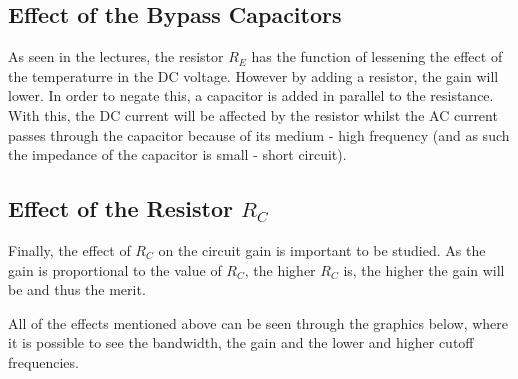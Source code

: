 \subsection{Effect of the Bypass Capacitors}

\par As seen in the lectures, the resistor $R_E$ has the function of lessening the effect of the temperaturre in the DC voltage. However by adding a resistor, the gain will lower. In order to negate this, a capacitor is added in parallel to the resistance. With this, the DC current will be affected by the resistor whilst the AC current passes through the capacitor because of its medium - high frequency (and as such the impedance of the capacitor is small - short circuit).

\subsection{Effect of the Resistor $R_C$}

\par Finally, the effect of $R_C$ on the circuit gain is important to be studied. As the gain is proportional to the value of $R_C$, the higher $R_C$ is, the higher the gain will be and thus the merit. 

\par All of the effects mentioned above can be seen through the graphics below, where it is possible to see the bandwidth, the gain and the lower and higher cutoff frequencies.
\newpage


